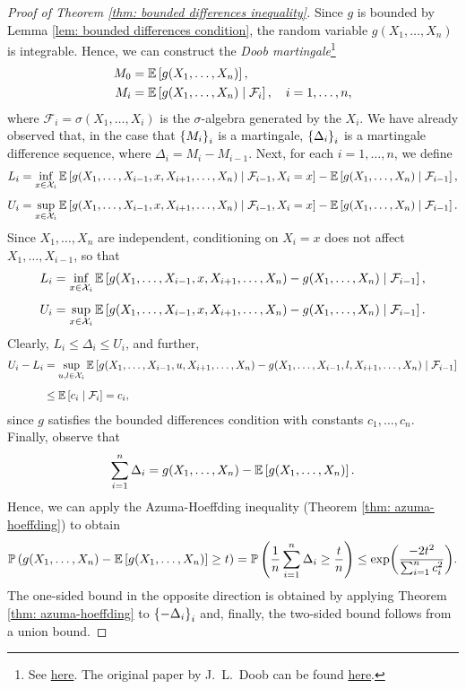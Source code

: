 \begin{proof}[Proof of Theorem \ref{thm: bounded differences inequality}]
Since $g$ is bounded by Lemma \ref{lem: bounded differences condition}, the random variable $g(X_1, \dots, X_n)$ is integrable. Hence, we can construct the \emph{Doob martingale}\footnote{See \href{https://en.wikipedia.org/wiki/Doob_martingale}{here}. The original paper by J.~L.~Doob can be found \href{https://www.ams.org/journals/tran/1940-047-03/S0002-9947-1940-0002052-6/S0002-9947-1940-0002052-6.pdf}{here}.}
\begin{align*}
    M_0 &= \mathbb{E}\left[g(X_1, \dots, X_n)\right], \\
    M_i &= \mathbb{E}\left[g(X_1, \dots, X_n) \mathrel{|} \mathcal{F}_i\right], \quad i = 1, \dots, n,
\end{align*}
where $\mathcal{F}_i = \sigma(X_1, \dots, X_i)$ is the $\sigma$-algebra generated by the $X_i$. We have already observed that, in the case that $\left\{M_i\right\}_i$ is a martingale, $\left\{\Delta_i\right\}_i$ is a martingale difference sequence, where $\Delta_i = M_i - M_{i-1}$. Next, for each $i = 1, \dots, n$, we define
\begin{align*}
    L_i &= \inf_{x \in \mathcal{X}_i} \mathbb{E}\left[g(X_1, \dots, X_{i-1}, x, X_{i+1}, \dots, X_n) \mathrel{|} \mathcal{F}_{i-1}, X_i = x\right] - \mathbb{E}\left[g(X_1, \dots, X_n) \mathrel{|} \mathcal{F}_{i-1}\right], \\[4pt]
    U_i &= \sup_{x \in \mathcal{X}_i} \mathbb{E}\left[g(X_1, \dots, X_{i-1}, x, X_{i+1}, \dots, X_n) \mathrel{|} \mathcal{F}_{i-1}, X_i = x\right] - \mathbb{E}\left[g(X_1, \dots, X_n) \mathrel{|} \mathcal{F}_{i-1}\right].
\end{align*}
Since $X_1, \dots, X_n$ are independent, conditioning on $X_i = x$ does not affect $X_1, \dots, X_{i-1}$, so that
\begin{align*}
    L_i &= \inf_{x \in \mathcal{X}_i} \mathbb{E}\left[g(X_1, \dots, X_{i-1}, x, X_{i+1}, \dots, X_n) - g(X_1, \dots, X_n) \mathrel{|} \mathcal{F}_{i-1}\right], \\[4pt]
    U_i &= \sup_{x \in \mathcal{X}_i} \mathbb{E}\left[g(X_1, \dots, X_{i-1}, x, X_{i+1}, \dots, X_n) - g(X_1, \dots, X_n) \mathrel{|} \mathcal{F}_{i-1}\right].
\end{align*}
Clearly, $L_i \leq \Delta_i \leq U_i$, and further,
\begin{align*}
    U_i - L_i &= \sup_{u, l \in \mathcal{X}_i} \mathbb{E}\left[g(X_1, \dots, X_{i-1}, u, X_{i+1}, \dots, X_n) - g(X_1, \dots, X_{i-1}, l, X_{i+1}, \dots, X_n) \mathrel{|} \mathcal{F}_{i-1}\right] \\[4pt]
        &\leq \mathbb{E}\left[c_i \mathrel{|} \mathcal{F}_i\right] = c_i,
\end{align*}
since $g$ satisfies the bounded differences condition with constants $c_1, \dots, c_n$. Finally, observe that
\[
    \sum_{i=1}^n \Delta_i = g(X_1, \dots, X_n) - \mathbb{E}\left[g(X_1, \dots, X_n)\right].
\]
Hence, we can apply the Azuma-Hoeffding inequality (Theorem \ref{thm: azuma-hoeffding}) to obtain
\[
    \mathbb{P}\left(g(X_1, \dots, X_n) - \mathbb{E}\left[g(X_1, \dots, X_n)\right] \geq t\right) = \mathbb{P}\left(\frac{1}{n}\sum_{i=1}^n \Delta_i \geq \frac{t}{n}\right) \leq \exp(\frac{-2t^2}{\sum_{i=1}^n c_i^2}).
\]
The one-sided bound in the opposite direction is obtained by applying Theorem \ref{thm: azuma-hoeffding} to $\left\{-\Delta_i\right\}_i$ and, finally, the two-sided bound follows from a union bound.
\end{proof}

